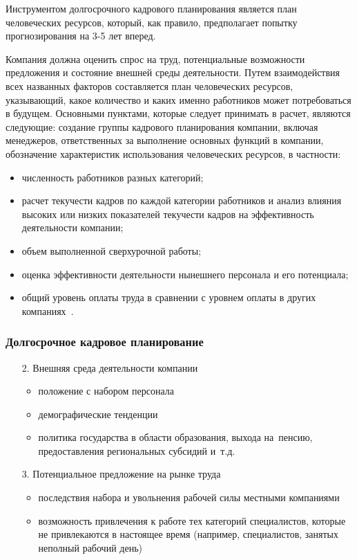 \documentclass{../industrial-development}
\begin{document}
\lecturenotes

Инструментом долгосрочного кадрового планирования является план человеческих ресурсов, который, как правило, предполагает попытку прогнозирования на 3-5 лет вперед.

Компания должна оценить спрос на труд, потенциальные возможности предложения и состояние внешней среды деятельности. Путем взаимодействия всех названных факторов составляется план человеческих ресурсов, указывающий, какое количество и
каких именно работников может потребоваться в будущем. Основными пунктами, которые следует принимать в расчет, являются следующие: создание группы кадрового планирования компании, включая менеджеров, ответственных за выполнение основных функций в компании, обозначение характеристик использования человеческих ресурсов, в частности:
 \begin{itemize}
\item численность работников разных категорий;
\item расчет текучести кадров по каждой категории работников и анализ влияния высоких
или низких показателей текучести кадров на эффективность деятельности компании;
\item объем выполненной сверхурочной работы;
\item оценка эффективности деятельности нынешнего персонала и его потенциала;
\item общий уровень оплаты труда в сравнении с уровнем оплаты в других компаниях~\cite[с.~86]{Ivanova}.
  \end{itemize}

\begin{frame} \frametitle{Долгосрочное кадровое планирование}
   \begin{itemize}
\item[2.] Внешняя среда деятельности компании
  \begin{itemize}
		\item	положение с набором персонала
		\item	демографические тенденции
		\item политика государства в области образования, выхода на~пенсию, предоставления региональных субсидий и~т.д.
  \end{itemize}

	\item[3.] Потенциальное предложение на рынке труда
	 \begin{itemize}
	\item последствия набора и увольнения рабочей силы местными компаниями
    \item возможность привлечения к работе тех категорий специалистов, которые не привлекаются в настоящее время (например, специалистов, занятых неполный рабочий день)
	\end{itemize}
  \end{itemize}
\end{frame}
\end{document}
